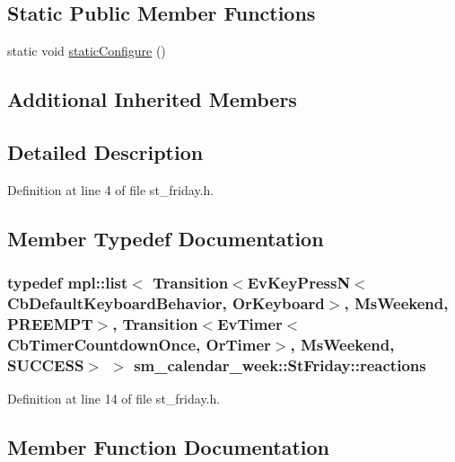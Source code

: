 \subsection*{Static Public Member Functions}
\begin{DoxyCompactItemize}
\item 
static void \hyperlink{structsm__calendar__week_1_1StFriday_a887ff28737ceb01b3540a1295bd75bb0}{static\+Configure} ()
\end{DoxyCompactItemize}
\subsection*{Additional Inherited Members}


\subsection{Detailed Description}


Definition at line 4 of file st\+\_\+friday.\+h.



\subsection{Member Typedef Documentation}
\subsubsection[{\texorpdfstring{reactions}{reactions}}]{\setlength{\rightskip}{0pt plus 5cm}typedef mpl\+::list$<$ Transition$<$Ev\+Key\+PressN$<$Cb\+Default\+Keyboard\+Behavior, {\bf Or\+Keyboard}$>$, {\bf Ms\+Weekend}, {\bf P\+R\+E\+E\+M\+PT}$>$, Transition$<$Ev\+Timer$<$Cb\+Timer\+Countdown\+Once, {\bf Or\+Timer}$>$, {\bf Ms\+Weekend}, {\bf S\+U\+C\+C\+E\+SS}$>$ $>$ {\bf sm\+\_\+calendar\+\_\+week\+::\+St\+Friday\+::reactions}}\hypertarget{structsm__calendar__week_1_1StFriday_a3086092f43c6f0426130aa46b55edaab}{}\label{structsm__calendar__week_1_1StFriday_a3086092f43c6f0426130aa46b55edaab}


Definition at line 14 of file st\+\_\+friday.\+h.



\subsection{Member Function Documentation}
